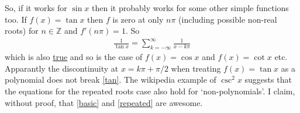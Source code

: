 \documentclass{article}
\begin{document}
So, if it works for $\sin x$ then it probably works for some other simple functions too. If $f(x) = \tan x$ then $f$ is zero at only $n\pi$ (including possible non-real roots) for $n \in \mathbb{Z}$ and $f'(n\pi) = 1$. So
\begin{align}
    \frac{1}{\tan x} = \sum_{k = -\infty}^{\infty} \frac{1}{x-k\pi} \label{tan}
\end{align}
which is also \href{https://en.wikipedia.org/wiki/Trigonometric_functions#Partial_fraction_expansion}{true} and so is the case of $f(x) = \cos x$ and $f(x) = \cot x$ etc. Apparantly the discontinuity at $x = k\pi + \pi/2$ when treating $f(x) = \tan x$ as a polynomial does not break \eqref{tan}. The wikipedia example of $\csc^2 x$ suggests that the equations for the repeated roots case also hold for `non-polynomials'. I claim, without proof, that \eqref{basic} and \eqref{repeated} are awesome.
\end{document}
